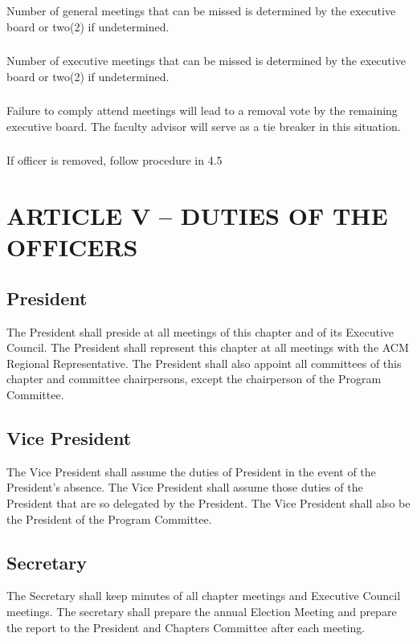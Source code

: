 \documentclass[12pt]{article}
\begin{document}
\subsubsection{} Number of general meetings that can be missed is determined by the executive board or two(2) if undetermined.
\subsubsection{} Number of executive meetings that can be missed is determined by the executive board or two(2) if undetermined.
\subsubsection{} Failure to comply attend meetings will lead to a removal vote by the remaining executive board. The faculty advisor will serve as a tie breaker in this situation.
\subsubsection{} If officer is removed, follow procedure in 4.5

\section{ARTICLE V – DUTIES OF THE OFFICERS}
\subsection{President}	The President shall preside at all meetings of this chapter and of its Executive Council. The President shall represent this chapter at all meetings with the ACM Regional Representative. The President shall also appoint all committees of this chapter and committee chairpersons, except the chairperson of the Program Committee.
\subsection{Vice President}	The Vice President shall assume the duties of President in the event of the President's absence. The Vice President shall assume those duties of the President that are so delegated by the President. The Vice President shall also be the President of the Program Committee.
\subsection{Secretary}	The Secretary shall keep minutes of all chapter meetings and Executive Council meetings. The secretary shall prepare the annual Election Meeting and prepare the report to the President and Chapters Committee after each meeting.
\end{document}
